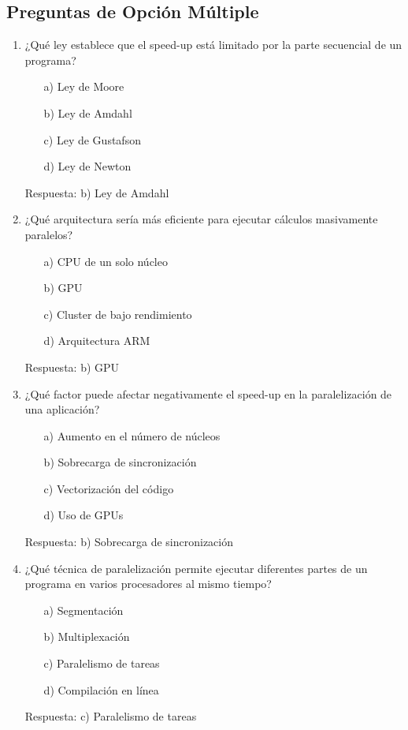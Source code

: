 \documentclass[12pt,a4paper]{article}
\begin{document}
	\subsection{Preguntas de Opción Múltiple}
	\begin{enumerate}
		\item ¿Qué ley establece que el speed-up está limitado por la parte secuencial de un programa?
		\begin{itemize}
			\item[a)] Ley de Moore
			\item[b)] Ley de Amdahl
			\item[c)] Ley de Gustafson
			\item[d)] Ley de Newton
		\end{itemize}
		Respuesta: b) Ley de Amdahl
		
		\item ¿Qué arquitectura sería más eficiente para ejecutar cálculos masivamente paralelos?
		\begin{itemize}
			\item[a)] CPU de un solo núcleo
			\item[b)] GPU
			\item[c)] Cluster de bajo rendimiento
			\item[d)] Arquitectura ARM
		\end{itemize}
		Respuesta: b) GPU
		
		\item ¿Qué factor puede afectar negativamente el speed-up en la paralelización de una aplicación?
		\begin{itemize}
			\item[a)] Aumento en el número de núcleos
			\item[b)] Sobrecarga de sincronización
			\item[c)] Vectorización del código
			\item[d)] Uso de GPUs
		\end{itemize}
		Respuesta: b) Sobrecarga de sincronización
		
		\item ¿Qué técnica de paralelización permite ejecutar diferentes partes de un programa en varios procesadores al mismo tiempo?
		\begin{itemize}
			\item[a)] Segmentación
			\item[b)] Multiplexación
			\item[c)] Paralelismo de tareas
			\item[d)] Compilación en línea
		\end{itemize}
		Respuesta: c) Paralelismo de tareas
		

\end{enumerate}
\end{document}
